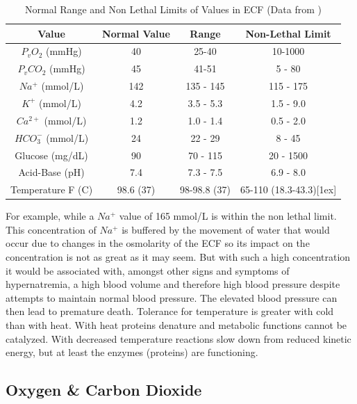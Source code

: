 \begin{table}[h!]
\centering
\begin{tabular}{||c c c c||} 
 \hline
Value & Normal Value & Range & Non-Lethal Limit\\ [0.5ex] 
 \hline\hline
 $P_v O_2$ (mmHg) & 40  & 25-40 & 10-1000 \\
 $P_v CO_2$ (mmHg) & 45 & 41-51 & 5 - 80\\ 
 $Na^+$ (mmol/L) & 142 & 135 - 145 & 115 - 175\\
 $K^+$  (mmol/L) & 4.2 & 3.5 - 5.3 & 1.5 - 9.0\\ 
 $Ca^{2+}$ (mmol/L) & 1.2 & 1.0 - 1.4 & 0.5 - 2.0 \\
 $HCO_3 ^-$ (mmol/L)& 24 & 22 - 29 & 8 - 45 \\
 Glucose (mg/dL)& 90 & 70 - 115 & 20 - 1500 \\
 Acid-Base (pH) & 7.4 & 7.3 - 7.5 & 6.9 - 8.0 \\
 Temperature F (C) & 98.6 (37) & 98-98.8 (37) & 65-110 (18.3-43.3)[1ex] 
 \hline
\end{tabular}
\caption{Normal Range and Non Lethal Limits of Values in ECF (\footnotesize{Data from \cite{feher_quantitative_2017}})}
\label{table:ecf_value_ranges}
\end{table}

For example, while a $Na^+$ value of 165 mmol/L is within the non lethal limit. This concentration of $Na^+$ is buffered by the movement of water that would occur due to changes in the osmolarity of the ECF so its impact on the concentration is not as great as it may seem. But with such a high concentration it would be associated with, amongst other signs and symptoms of hypernatremia, a high blood volume and therefore high blood pressure despite attempts to maintain normal blood pressure. The elevated blood pressure can then lead to premature death.  Tolerance for temperature is greater with cold than with heat. With heat proteins denature and metabolic functions cannot be catalyzed. With decreased temperature reactions slow down from reduced kinetic energy, but at least the enzymes (proteins) are functioning. 


\subsection{Oxygen \& Carbon Dioxide}

